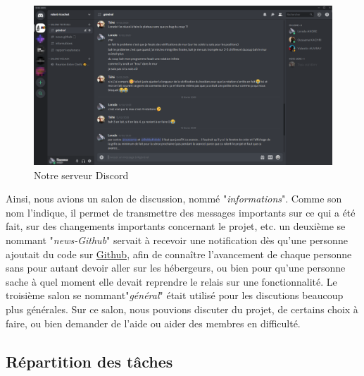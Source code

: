\documentclass[a4paper, 12pt]{article}
\begin{document}
			\begin{figure}[H]
				\centering\includegraphics[scale=1]{images/discord.png}
				\caption{Notre serveur Discord}
			\end{figure}
			
			 Ainsi, nous avions un salon de discussion, nommé "\textit{informations}". Comme son nom l'indique, il permet de transmettre des messages importants sur ce qui a été fait, sur des changements importants concernant le projet, etc. un deuxième se nommant "\textit{news-Github}" servait à recevoir une notification dès qu'une personne ajoutait du code sur \href{https://github.com/}{Github}, afin de connaître l'avancement de chaque personne sans pour autant devoir aller sur les hébergeurs, ou bien pour qu'une personne sache à quel moment elle devait reprendre le relais sur une fonctionnalité. Le troisième salon se nommant"\textit{général}" était utilisé pour les discutions beaucoup plus générales. Sur ce salon, nous pouvions discuter du projet, de certains choix à faire, ou bien demander de l'aide ou aider des membres en difficulté.
			
			
    \subsection{Répartition des tâches}
    
\end{document}
